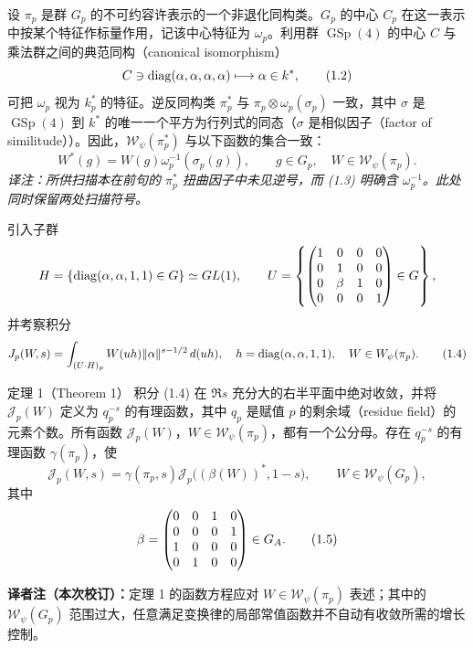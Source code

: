 设 $\pi_p$ 是群 $G_p$ 的不可约容许表示的一个非退化同构类。$G_p$ 的中心 $C_p$ 在这一表示中按某个特征作标量作用，记该中心特征为 $\omega_p$。利用群 $\operatorname{GSp}(4)$ 的中心 $C$ 与乘法群之间的典范同构（canonical isomorphism）
\begin{equation}
 C\ni\operatorname{diag}(\alpha,\alpha,\alpha,\alpha)\longmapsto\alpha\in k^*,
 \tag{1.2}
\end{equation}
可把 $\omega_p$ 视为 $k_p^*$ 的特征。逆反同构类 $\pi_p^*$ 与 $\pi_p\otimes\omega_p(\sigma_p)$ 一致，其中 $\sigma$ 是 $\operatorname{GSp}(4)$ 到 $k^*$ 的唯一一个平方为行列式的同态（$\sigma$ 是相似因子（factor of similitude））。因此，$\mathcal W_\psi(\pi_p^*)$ 与以下函数的集合一致：
\begin{equation}
 W^*(g)=W(g)\omega_p^{-1}(\sigma_p(g)),
 \qquad g\in G_p,\quad W\in\mathcal W_\psi(\pi_p).
 \tag{1.3}
\end{equation}
\noindent\emph{译注：所供扫描本在前句的 $\pi_p^*$ 扭曲因子中未见逆号，而 (1.3) 明确含 $\omega_p^{-1}$。此处同时保留两处扫描符号。}

引入子群
\[
 H=\{\operatorname{diag}(\alpha,\alpha,1,1)\in G\}\simeq GL(1),\qquad
 U=\left\{\begin{pmatrix}1&0&0&0\\0&1&0&0\\0&\beta&1&0\\0&0&0&1\end{pmatrix}\in G\right\},
\]
并考察积分
\begin{equation}
 J_p(W,s)=\int_{(U\cdot H)_p}W(uh)\|\alpha\|^{s-1/2}\,d(uh),
 \quad h=\operatorname{diag}(\alpha,\alpha,1,1),\quad W\in W_\psi(\pi_p).
 \tag{1.4}
\end{equation}

\begin{originaltheorem}{定理 1（Theorem 1）}
积分 (1.4) 在 $\Re s$ 充分大的右半平面中绝对收敛，并将 $\mathcal J_p(W)$ 定义为 $q_p^{-s}$ 的有理函数，其中 $q_p$ 是赋值 $p$ 的剩余域（residue field）的元素个数。所有函数 $\mathcal J_p(W)$，$W\in\mathcal W_\psi(\pi_p)$，都有一个公分母。存在 $q_p^{-s}$ 的有理函数 $\gamma(\pi_p)$，使
\[
 \mathcal J_p(W,s)=\gamma(\pi_p,s)
 \mathcal J_p\bigl((\beta(W))^*,1-s\bigr),\qquad W\in\mathcal W_\psi(G_p),
\]
其中
\begin{equation}
 \beta=\begin{pmatrix}0&0&1&0\\0&0&0&1\\1&0&0&0\\0&1&0&0\end{pmatrix}\in G_A.
 \tag{1.5}
\end{equation}
\end{originaltheorem}
\noindent\footnotesize\textbf{译者注（本次校订）：}定理 1 的函数方程应对 $W\in\mathcal W_\psi(\pi_p)$ 表述；其中的 $\mathcal W_\psi(G_p)$ 范围过大，任意满足变换律的局部常值函数并不自动有收敛所需的增长控制。\normalsize

